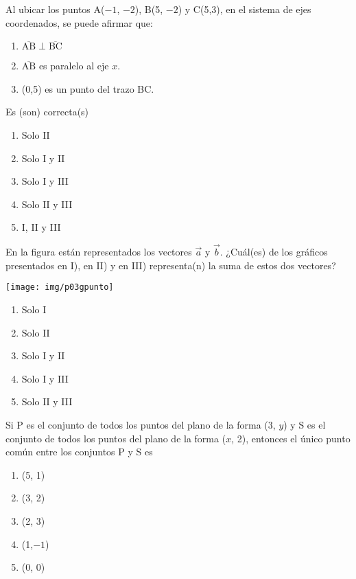 \begin{enumerate}[label=\large{\textbf{\arabic*.}}, itemsep = 0.15cm, topsep = 0.5cm]
	
	\parbox{1\linewidth}{ \item Al ubicar los puntos A($-1$, $-2$), B(5, $-2$) y C(5,3), en el sistema de ejes coordenados, se puede afirmar que:
		\begin{enumerate}[label={\Roman*)}, itemsep = 0.5cm, topsep = 0.5cm, leftmargin = 2.4cm]
			\item $\overline{\mbox{AB}}\perp\overline{\mbox{BC}}$
			\item $\overline{\mbox{AB}}$ es paralelo al eje $x$.
			\item (0,5) es un punto del trazo BC.
		\end{enumerate}
		Es (son) correcta(s) 
		\begin{enumerate}[label={\Alph*)}, itemsep = 0.15cm, topsep = 0.5cm]
			\item Solo II
			\item Solo I y II
			\item Solo I y III
			\item Solo II y III
			\item I, II y III
	\end{enumerate}}
	
	\newpage
	\vspace*{-1.5cm}
	
	\parbox{1\linewidth}{ \item En la figura están representados los vectores $\vec{a}$ y $\vec{b}$. ¿Cuál(es) de los gráficos presentados en I), en II) y en III) representa(n) la suma de estos dos vectores? 
		
		\vspace*{-.3cm}
		\begin{center}
			\texttt{[image: img/p03gpunto]}
		\end{center}
		\begin{enumerate}[label={\Alph*)}, itemsep = 0.15cm, topsep = 0.3cm]
			\item Solo I
			\item Solo II
			\item Solo I y II
			\item Solo I y III
			\item Solo II y III
	\end{enumerate}}
	
	
	\parbox{1\linewidth}{ \item Si P es el conjunto de todos los puntos del plano de la forma (3, $y$) y S es el conjunto de todos los puntos del plano de la forma ($x$, 2), entonces el único punto común entre los conjuntos P y S es
		\begin{enumerate}[label={\Alph*)}, itemsep = 0.15cm, topsep = 0.5cm]
			\item (5, 1)
			\item (3, 2)
			\item (2, 3)
			\item  (1,$-1$)
			\item  (0, 0)
	\end{enumerate}}
	

\end{enumerate}
